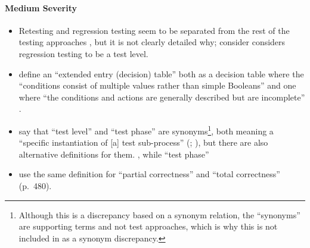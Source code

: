\paragraph{Medium Severity}
\begin{itemize}\fi
      \item Retesting and regression testing seem to be separated from the rest
            of the testing approaches \citep[p.~23]{IEEE2022}, but it is not
            clearly detailed why; \citet[p.~3]{BarbosaEtAl2006} \ifnotpaper
                  consider \else considers \fi regression testing to be a test level.
            \ifnotpaper
      \item \citeauthor{IEEE2021} define an ``extended entry (decision) table''
            both as a decision table where the ``conditions consist of multiple
            values rather than simple Booleans'' \citeyearpar[p.~18]{IEEE2021}
            and one where ``the conditions and actions are generally described
            but are incomplete'' \citeyearpar[p.~175]{IEEE2017}.
      \item \citeauthor*{IEEE2017} say that ``test level'' and ``test phase''
            are synonyms\footnote{Although this is a discrepancy based on a
                  synonym relation, the ``synonyms'' are supporting terms and
                  not test approaches, which is why this is not included in
                   as a synonym discrepancy.}, both meaning a
            ``specific instantiation of [a] test sub-process''
            (\citeyear[pp.~469,~470]{IEEE2017}; \citeyear[p.~9]{IEEE2013}), but
            there are also alternative definitions for them.
            \procLevel{\citeyearpar}, while ``test phase'' \phaseDef{}
      \item \citeauthor{IEEE2017} use the same definition for ``partial correctness''
            \citeyearpar[p.~314]{IEEE2017} and ``total correctness'' (p.~480).
            \fi
\end{itemize}

\ifnotpaper
